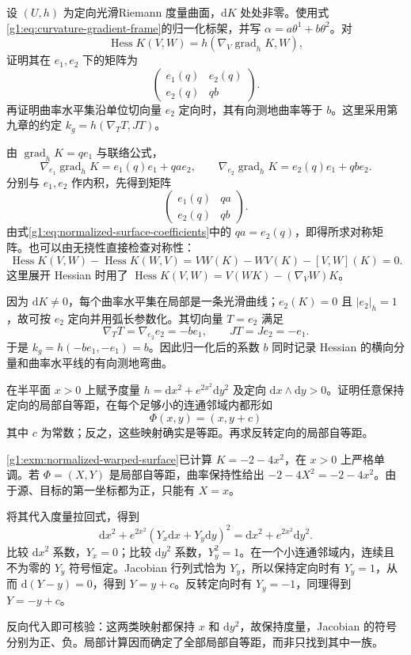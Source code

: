 \begin{exercise}\label{g1:ex:normalized-curvature-hessian}
	设 \((U,h)\) 为定向光滑Riemann 度量曲面，\(\mathrm{d}K\) 处处非零。使用式\eqref{g1:eq:curvature-gradient-frame}的归一化标架，并写 \(\alpha=a\theta^1+b\theta^2\)。对
	\[
		\operatorname{Hess}K(V,W)=h(\nabla_V\operatorname{grad}_hK,W),
	\]
	证明其在 \(e_1,e_2\) 下的矩阵为
	\[
		\begin{pmatrix}e_1(q)&e_2(q)\\e_2(q)&qb\end{pmatrix}.
	\]
	再证明曲率水平集沿单位切向量 \(e_2\) 定向时，其有向测地曲率等于 \(b\)。这里采用第九章的约定 \(k_g=h(\nabla_TT,JT)\)。
\end{exercise}
\begin{solution}
	由 \(\operatorname{grad}_hK=qe_1\) 与联络公式，
	\[
		\nabla_{e_1}\operatorname{grad}_hK=e_1(q)e_1+qa e_2,
		\qquad
		\nabla_{e_2}\operatorname{grad}_hK=e_2(q)e_1+qb e_2.
	\]
	分别与 \(e_1,e_2\) 作内积，先得到矩阵
	\[
		\begin{pmatrix}e_1(q)&qa\\e_2(q)&qb\end{pmatrix}.
	\]
	由式\eqref{g1:eq:normalized-surface-coefficients}中的 \(qa=e_2(q)\)，即得所求对称矩阵。也可以由无挠性直接检查对称性：
	\[
		\operatorname{Hess}K(V,W)-\operatorname{Hess}K(W,V)
		=VW(K)-WV(K)-[V,W](K)=0.
	\]
	这里展开 Hessian 时用了 \(\operatorname{Hess}K(V,W)=V(WK)-(\nabla_VW)K\)。

	因为 \(\mathrm{d}K\ne0\)，每个曲率水平集在局部是一条光滑曲线；\(e_2(K)=0\) 且 \(|e_2|_h=1\)，故可按 \(e_2\) 定向并用弧长参数化。其切向量 \(T=e_2\) 满足
	\[
		\nabla_TT=\nabla_{e_2}e_2=-b e_1,\qquad JT=Je_2=-e_1.
	\]
	于是 \(k_g=h(-be_1,-e_1)=b\)。因此归一化后的系数 \(b\) 同时记录 Hessian 的横向分量和曲率水平线的有向测地弯曲。
\end{solution}

\begin{exercise}\label{g1:ex:warped-surface-local-symmetries}
	在半平面 \(x>0\) 上赋予度量 \(h=\mathrm{d}x^2+e^{2x^2}\mathrm{d}y^2\) 及定向 \(\mathrm{d}x\wedge\mathrm{d}y>0\)。证明任意保持定向的局部自等距，在每个足够小的连通邻域内都形如
	\[
		\Phi(x,y)=(x,y+c)
	\]
	其中 \(c\) 为常数；反之，这些映射确实是等距。再求反转定向的局部自等距。
\end{exercise}
\begin{solution}
	\cref{g1:exm:normalized-warped-surface}已计算 \(K=-2-4x^2\)，在 \(x>0\) 上严格单调。若 \(\Phi=(X,Y)\) 是局部自等距，曲率保持性给出 \(-2-4X^2=-2-4x^2\)。由于源、目标的第一坐标都为正，只能有 \(X=x\)。

	将其代入度量拉回式，得到
	\[
		\mathrm{d}x^2+e^{2x^2}(Y_x\mathrm{d}x+Y_y\mathrm{d}y)^2
		=\mathrm{d}x^2+e^{2x^2}\mathrm{d}y^2.
	\]
	比较 \(\mathrm{d}x^2\) 系数，\(Y_x=0\)；比较 \(\mathrm{d}y^2\) 系数，\(Y_y^2=1\)。在一个小连通邻域内，连续且不为零的 \(Y_y\) 符号恒定。Jacobian 行列式恰为 \(Y_y\)，所以保持定向时有 \(Y_y=1\)，从而 \(\mathrm{d}(Y-y)=0\)，得到 \(Y=y+c\)。反转定向时有 \(Y_y=-1\)，同理得到 \(Y=-y+c\)。

	反向代入即可核验：这两类映射都保持 \(x\) 和 \(\mathrm{d}y^2\)，故保持度量，Jacobian 的符号分别为正、负。局部计算因而确定了全部局部自等距，而非只找到其中一族。
\end{solution}

